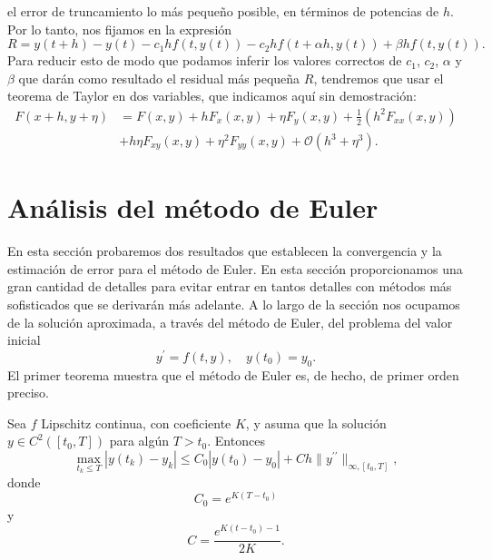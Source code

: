 el error de truncamiento lo más pequeño posible, en términos de potencias de $h$. Por lo tanto, nos fijamos en la expresión
\begin{equation}
R=y\left(t+h\right)-y\left(t\right)-c_{1}hf\left(t,y\left(t\right)\right)-c_{2}hf\left(t+\alpha h, y\left(t\right)\right)+\beta hf\left(t,y\left(t\right)\right).
\end{equation}
Para reducir esto de modo que podamos inferir los valores correctos de $c_{1}$, $c_{2}$, $\alpha$ y $\beta$ que darán como resultado el residual más pequeña $R$, tendremos que usar el teorema de Taylor en dos variables, que indicamos aquí sin demostración:
\begin{align*}
F\left(x+h,y+\eta\right)
&=F\left(x,y\right)+hF_{x}\left(x,y\right)+\eta F_{y}\left(x,y\right)+\frac{1}{2}\left(h^{2}F_{xx}\left(x,y\right)\right)\\
&+h\eta F_{xy}\left(x,y\right)+\eta^{2}F_{yy}\left(x,y\right)+\mathcal{O}\left(h^{3}+\eta^{3}\right).
\end{align*}

\newpage

\section{Análisis del método de Euler}
En esta sección probaremos dos resultados que establecen la convergencia y la estimación de error para el método de Euler. En esta sección proporcionamos una gran cantidad de detalles para evitar entrar en tantos detalles con métodos más sofisticados que se derivarán más adelante. A lo largo de la sección nos ocupamos de la solución aproximada, a través del método de Euler, del problema del valor inicial
\[ y^{\prime}=f\left(t,y\right),\quad y\left(t_{0}\right)=y_{0}. \]
El primer teorema muestra que el método de Euler es, de hecho, de primer orden preciso.

\begin{theorem}
Sea $f$ Lipschitz continua, con coeficiente $K$, y asuma que la solución $y\in C^{2}\left(\left[t_{0},T\right]\right)$ para algún $T>t_{0}$. Entonces
\[ \max_{t_{k}\leq T}\left|y\left(t_{k}\right)-y_{k}\right|\leq C_{0}\left|y\left(t_{0}\right)-y_{0}\right|+Ch\|y^{\prime\prime}\|_{\infty,\left[t_{0},T\right]}, \] donde \[ C_{0}=e^{K\left(T-t_{0}\right)} \] y \[ C=\frac{e^{K\left(t-t_{0}\right)-1}}{2K}. \]
\end{theorem}

